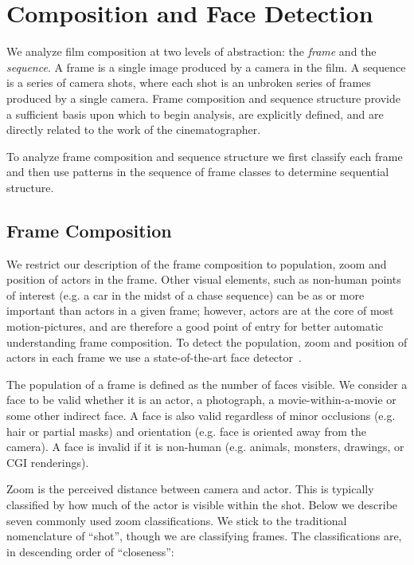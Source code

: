 \section*{Composition and Face Detection}

We analyze film composition at two levels of abstraction: the \emph{frame} and the \emph{sequence}.  A frame is a single image produced by a camera in the film.  A sequence is a series of camera shots, where each shot is an unbroken series of frames produced by a single camera.  Frame composition and sequence structure provide a sufficient basis upon which to begin analysis, are explicitly defined, and are directly related to the work of the cinematographer.

To analyze frame composition and sequence structure we first classify each frame and then use patterns in the sequence of frame classes to determine sequential structure.

\subsection*{Frame Composition}

We restrict our description of the frame composition to population, zoom and position of actors in the frame. Other visual elements, such as non-human points of interest (e.g. a car in the midst of a chase sequence) can be as or more important than actors in a given frame; however, actors are at the core of most motion-pictures, and are therefore a good point of entry for better automatic understanding frame composition. To detect the population, zoom and position of actors in each frame we use a state-of-the-art face detector~\cite{mathias_face_2014}.

The population of a frame is defined as the number of faces visible. We consider a face to be valid whether it is an actor, a photograph, a movie-within-a-movie or some other indirect face. A face is also valid regardless of minor occlusions (e.g. hair or partial masks) and orientation (e.g. face is oriented away from the camera). A face is invalid if it is non-human (e.g. animals, monsters, drawings, or CGI renderings). 

Zoom is the perceived distance between camera and actor. This is typically classified by how much of the actor is visible within the shot. Below we describe seven commonly used zoom classifications. We stick to the traditional nomenclature of ``shot'', though we are classifying frames. The classifications are, in descending order of ``closeness'':


